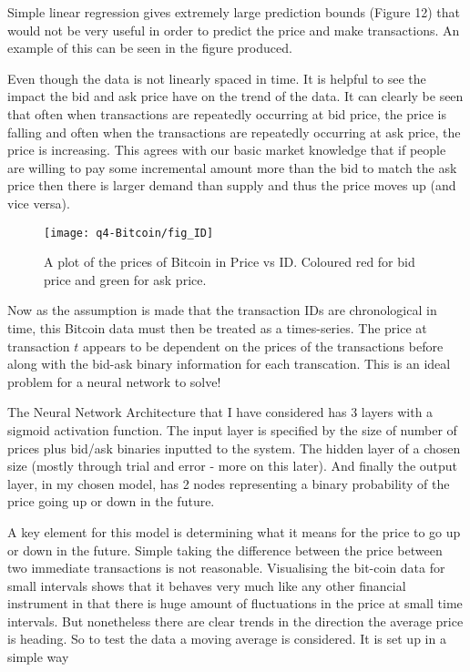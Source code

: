 \documentclass{article}
\begin{document}
Simple linear regression gives extremely large prediction bounds (Figure 12) that would not be very useful in order to predict the price and make transactions. An example of this can be seen in the figure produced.


Even though the data is not linearly spaced in time. It is helpful to see the impact the bid and ask price have on the trend of the data. It can clearly be seen that often when transactions are repeatedly occurring at bid price, the price is falling and often when the transactions are repeatedly occurring at ask price, the price is increasing. This agrees with our basic market knowledge that if people are willing to pay some incremental amount more than the bid to match the ask price then there is larger demand than supply and thus the price moves up (and vice versa).

\begin{figure}[h!]
		\centering
		\texttt{[image: q4-Bitcoin/fig\_ID]}
		\caption{A plot of the prices of Bitcoin in Price vs ID. Coloured red for bid price and green for ask price.}
\end{figure}

Now as the assumption is made that the transaction IDs are chronological in time, this Bitcoin data must then be treated as a times-series. The price at transaction $t$ appears to be dependent on the prices of the transactions before along with the bid-ask binary information for each transcation. This is an ideal problem for a neural network to solve! 

The Neural Network Architecture that I have considered has 3 layers with a sigmoid activation function. The input layer is specified by the size of number of prices plus bid/ask binaries inputted to the system. The hidden layer of a chosen size (mostly through trial and error - more on this later). And finally the output layer, in my chosen model, has 2 nodes representing a binary probability of the price going up or down in the future.

A key element for this model is determining what it means for the price to go up or down in the future. Simple taking the difference between the price between two immediate transactions is not reasonable. Visualising the bit-coin data for small intervals shows that it behaves very much like any other financial instrument in that there is huge amount of fluctuations in the price at small time intervals. But nonetheless there are clear trends in the direction the average price is heading. So to test the data a moving average is considered. It is set up in a simple way
\end{document}

